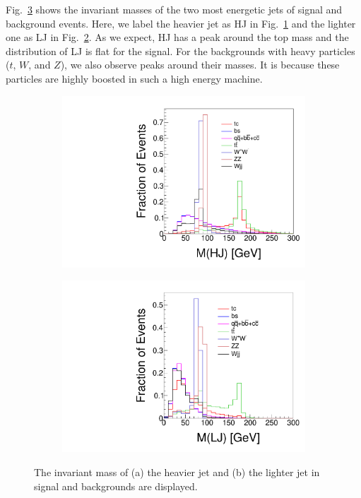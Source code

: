 \documentclass[a4paper,11pt]{article}
\begin{document}
Fig.~\ref{fig:mj1mj2} shows the invariant masses of the two most energetic jets of signal and background events. 
Here, we label the heavier jet as HJ in Fig.~\ref{fig:mj1} and the lighter one as LJ in Fig.~\ref{fig:mj2}.
As we expect, HJ has a peak around the top mass and the distribution of LJ is flat for the signal.
For the backgrounds with heavy particles ($t$, $W$, and $Z$), we also observe peaks around their masses. 
It is because these particles are highly boosted in such a high energy machine. 

\begin{figure}[htbp]
  \centering
  \captionsetup[sub]{font=large}
  \begin{subfigure}[t]{0.45\textwidth}
     \includegraphics[width=\linewidth]{mj1.pdf}
     \caption{}
     \label{fig:mj1}
  \end{subfigure}
  \begin{subfigure}[t]{0.45\textwidth}
     \includegraphics[width=\linewidth]{mj2.pdf}
     \caption{}
     \label{fig:mj2}
  \end{subfigure}
  \caption{The invariant mass of (a) the heavier jet and (b) the lighter jet in signal and backgrounds are displayed.}\label{fig:mj1mj2}
\end{figure}
\end{document}
